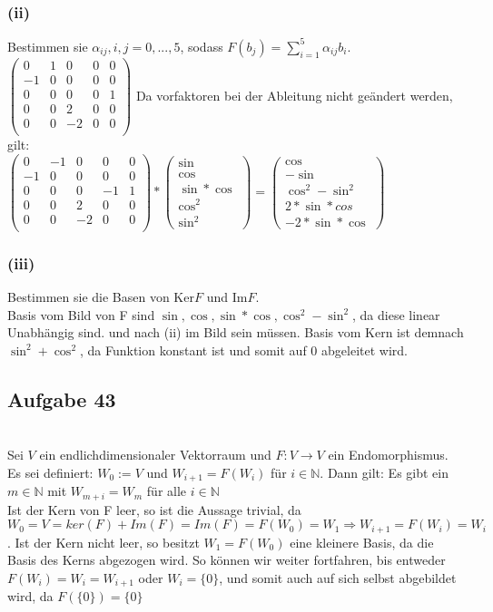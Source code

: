 \documentclass[12pt]{article}
\begin{document}
\subsubsection*{(ii)}Bestimmen sie $\alpha_{ij}, i,j=0,...,5$, sodass $F(b_j)=\sum_{i=1}^5\alpha_{ij}b_i$.
$\begin{pmatrix}
0 & 1 & 0 & 0 & 0\\
-1& 0 & 0 & 0 & 0\\
0 & 0 & 0 & 0 & 1\\
0 & 0 & 2 & 0 & 0\\
0 & 0 & -2 & 0 & 0\\ 
\end{pmatrix}$
Da vorfaktoren bei der Ableitung nicht ge{\"a}ndert werden, gilt:\\ 
$\begin{pmatrix}
0 & -1 & 0 & 0 & 0\\
-1& 0 & 0 & 0 & 0\\
0 & 0 & 0 & -1 & 1\\
0 & 0 & 2 & 0 & 0\\
0 & 0 & -2 & 0 & 0\\
\end{pmatrix} * \begin{pmatrix}
\sin \\ \cos \\ \sin*\cos \\ \cos^2 \\ \sin^2
\end{pmatrix} = \begin{pmatrix}
\cos \\ -\sin \\ \cos^2-\sin^2 \\ 2*\sin*cos \\ -2*\sin*\cos
\end{pmatrix}$
\subsubsection*{(iii)}Bestimmen sie die Basen von Ker$F$ und Im$F$.\\
Basis vom Bild von F sind $\sin, \cos, \sin*\cos, \cos^2-\sin^2$, da diese linear Unabh{\"a}ngig sind. und nach (ii) im Bild sein m{\"u}ssen. Basis vom Kern ist demnach $\sin^2+\cos^2$, da  Funktion konstant ist und somit auf $0$ abgeleitet wird.
\subsection*{Aufgabe 43}\hfill\\
Sei $V$ ein endlichdimensionaler Vektorraum und $F: V \rightarrow V$ ein Endomorphismus. Es sei definiert: $W_0:=V$ und $W_{i+1}=F(W_i)$ f{\"u}r $i\in\mathbb{N}$. Dann gilt: Es gibt ein $m \in \mathbb{N}$ mit $W_{m+i}=W_m$ f{\"u}r alle $i\in\mathbb{N}$\\
Ist der Kern von F leer, so ist die Aussage trivial, da $W_0=V=ker(F)+Im(F)=Im(F)=F(W_0)=W_1 \Rightarrow W_{i+1}=F(W_i)=W_i$. Ist der Kern nicht leer, so besitzt $W_1=F(W_0)$ eine kleinere Basis, da die Basis des Kerns abgezogen wird. So k{\"o}nnen wir weiter fortfahren, bis entweder $F(W_i)=W_i=W_{i+1}$ oder $W_i=\{0\}$, und somit auch auf sich selbst abgebildet wird, da $F(\{0\})=\{0\}$
\end{document}
